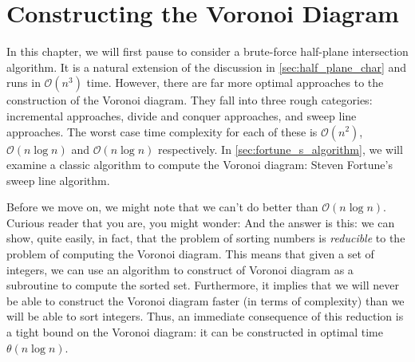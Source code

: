 \documentclass[12pt,twoside]{reedthesis}
\begin{document}
    \chapter{Constructing the Voronoi Diagram}

    In this chapter, we will first pause to consider a brute-force half-plane intersection algorithm. It is a natural extension of the discussion in \cref{sec:half_plane_char} and runs in $\mathcal{O}(n^3)$ time. However, there are far more optimal approaches to the construction of the Voronoi diagram. They fall into three rough categories: incremental approaches, divide and conquer approaches, and sweep line approaches. The worst case time complexity for each of these is $\mathcal{O}(n^{2})$, $\mathcal{O}(n\log n)$ and $\mathcal{O}(n\log n)$ respectively. In \cref{sec:fortune_s_algorithm}, we will examine a classic algorithm to compute the Voronoi diagram: Steven Fortune's sweep line algorithm.\par

    Before we move on, we might note that we can't do better than $\mathcal{O}(n\log n)$. Curious reader that you are, you might wonder:  And the answer is this: we can show, quite easily, in fact, that the problem of sorting numbers is \emph{reducible} to the problem of computing the Voronoi diagram. This means that given a set of integers, we can use an algorithm to construct of Voronoi diagram as a subroutine to compute the sorted set. Furthermore, it implies that we will never be able to construct the Voronoi diagram faster (in terms of complexity) than we will be able to sort integers. Thus, an immediate consequence of this reduction is a tight bound on the Voronoi diagram: it can be constructed in optimal time $\theta(n\log n)$.\par
\end{document}
